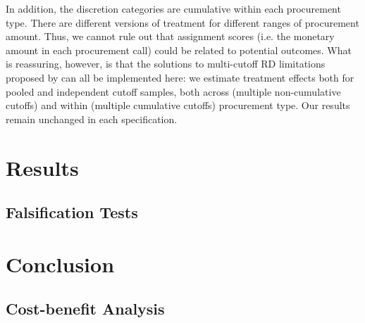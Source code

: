 \documentclass[11pt]{article}
\begin{document}
In addition, the discretion categories are cumulative within each procurement type. There are different versions of treatment for different ranges of procurement amount. Thus, we cannot rule out that assignment scores (i.e. the monetary amount in each procurement call) could be related to potential outcomes. What is reassuring, however, is that the solutions to multi-cutoff RD limitations proposed by \citet{CattaneoInterpretingRegressionDiscontinuity2016} can all be implemented here: we estimate treatment effects both for pooled and independent cutoff samples, both across (multiple non-cumulative cutoffs) and within (multiple cumulative cutoffs) procurement type. Our results remain unchanged in each specification.

\section{Results} \label{sec:result}

\subsection{Falsification Tests} \label{subsec:discussion}

\section{Conclusion} \label{sec:conclusion}

\subsection{Cost-benefit Analysis} \label{subsec:cba}


\setlength\bibsep{0pt}



\clearpage





\end{document}
